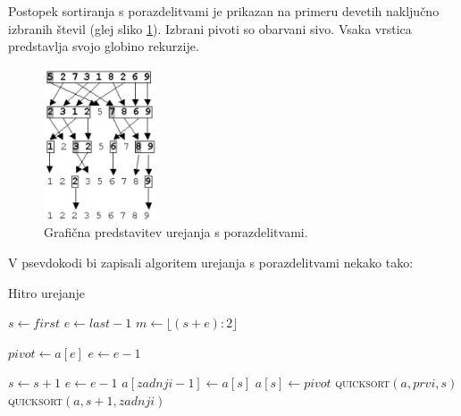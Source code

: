 \documentclass[a4paper,oneside]{article}
\begin{document}
Postopek sortiranja s porazdelitvami je prikazan na primeru devetih naključno
izbranih števil (glej sliko \ref{fig:quicksortimage}). Izbrani pivoti so obarvani sivo.
Vsaka vrstica predstavlja svojo globino rekurzije.

\begin{figure}[h]
    \begin{center}
        \includegraphics[height=45mm]{slike/quicksort.jpg}
    \end{center}
    \vspace{-0.7cm}
    \caption{Grafična predstavitev urejanja s porazdelitvami.}
    \label{fig:quicksortimage}
\end{figure}

V psevdokodi bi zapisali algoritem urejanja s porazdelitvami nekako tako:


\begin{algorithm}
  \caption{Hitro urejanje}\label{algo:quicksort}
  \begin{algorithmic}[1]
         \Return \EndIf
        \State $s \gets first$
        \State $e \gets last - 1$
        \State $m \gets \lfloor(s+e):2\rfloor$
  \end{algorithmic}
\end{algorithm}
\begin{algorithm}
  \begin{algorithmic}[1]
        \EndIf

        \State $pivot \gets a[e]$
        \State $e \gets e - 1$

                \State $s \gets s + 1$
            \EndWhile
                \State $e \gets e - 1$
            \EndWhile
            \EndIf
        \EndWhile
        \State $a[zadnji - 1] \gets a[s]$
        \State $a[s] \gets pivot$
        \State \textsc{quicksort}$(a, prvi, s)$
        \State \textsc{quicksort}$(a, s + 1, zadnji)$
    \EndFunction
  \end{algorithmic}
\end{algorithm}
\end{document}
